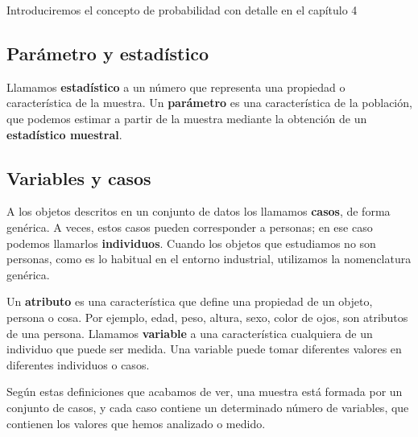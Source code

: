 \documentclass[
  letterpaper,
  DIV=11,
  numbers=noendperiod,
  oneside]{scrreprt}
\begin{document}
\begin{tcolorbox}[enhanced jigsaw, colback=white, opacitybacktitle=0.6, leftrule=.75mm, opacityback=0, coltitle=black, colframe=quarto-callout-important-color-frame, colbacktitle=quarto-callout-important-color!10!white, bottomrule=.15mm, title=\textcolor{quarto-callout-important-color}{\faExclamation}\hspace{0.5em}{¿Qué es la probabilidad?}, bottomtitle=1mm, toptitle=1mm, breakable, left=2mm, arc=.35mm, titlerule=0mm, rightrule=.15mm, toprule=.15mm]

Introduciremos el concepto de probabilidad con detalle en el capítulo 4

\end{tcolorbox}

\hypertarget{paruxe1metro-y-estaduxedstico}{%
\subsection{Parámetro y
estadístico}\label{paruxe1metro-y-estaduxedstico}}

Llamamos \textbf{estadístico} a un número que representa una propiedad o
característica de la muestra. Un \textbf{parámetro} es una
característica de la población, que podemos estimar a partir de la
muestra mediante la obtención de un \textbf{estadístico muestral}.

\hypertarget{variables-y-casos}{%
\subsection{Variables y casos}\label{variables-y-casos}}

A los objetos descritos en un conjunto de datos los llamamos
\textbf{casos}, de forma genérica. A veces, estos casos pueden
corresponder a personas; en ese caso podemos llamarlos
\textbf{individuos}. Cuando los objetos que estudiamos no son personas,
como es lo habitual en el entorno industrial, utilizamos la nomenclatura
genérica.

Un \textbf{atributo} es una característica que define una propiedad de
un objeto, persona o cosa. Por ejemplo, edad, peso, altura, sexo, color
de ojos, son atributos de una persona. Llamamos \textbf{variable} a una
característica cualquiera de un individuo que puede ser medida. Una
variable puede tomar diferentes valores en diferentes individuos o
casos.

Según estas definiciones que acabamos de ver, una muestra está formada
por un conjunto de casos, y cada caso contiene un determinado número de
variables, que contienen los valores que hemos analizado o medido.
\end{document}
